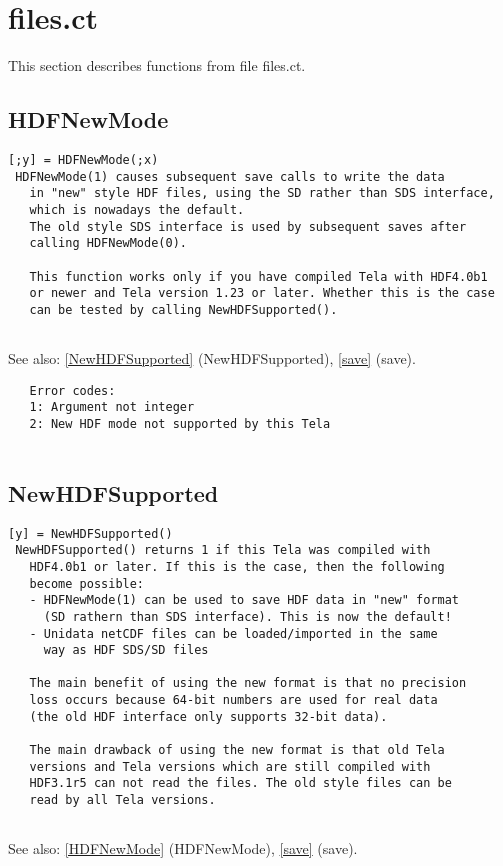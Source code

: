 \documentclass[a4paper]{article}
\begin{document}
\section{files.ct}

This section describes functions from file files.ct.




\subsection{HDFNewMode\label{HDFNewMode}}

\begin{tscreen}
\begin{verbatim}
[;y] = HDFNewMode(;x)
 HDFNewMode(1) causes subsequent save calls to write the data
   in "new" style HDF files, using the SD rather than SDS interface,
   which is nowadays the default.
   The old style SDS interface is used by subsequent saves after
   calling HDFNewMode(0).
   
   This function works only if you have compiled Tela with HDF4.0b1
   or newer and Tela version 1.23 or later. Whether this is the case
   can be tested by calling NewHDFSupported().
   
\end{verbatim}

See also: \ref{NewHDFSupported} {(NewHDFSupported)}, \ref{save} {(save)}.
\begin{verbatim}
   Error codes:
   1: Argument not integer
   2: New HDF mode not supported by this Tela
   
\end{verbatim}
\end{tscreen}



\subsection{NewHDFSupported\label{NewHDFSupported}}

\begin{tscreen}
\begin{verbatim}
[y] = NewHDFSupported()
 NewHDFSupported() returns 1 if this Tela was compiled with
   HDF4.0b1 or later. If this is the case, then the following
   become possible:
   - HDFNewMode(1) can be used to save HDF data in "new" format
     (SD rathern than SDS interface). This is now the default!
   - Unidata netCDF files can be loaded/imported in the same
     way as HDF SDS/SD files
   
   The main benefit of using the new format is that no precision
   loss occurs because 64-bit numbers are used for real data
   (the old HDF interface only supports 32-bit data).
   
   The main drawback of using the new format is that old Tela
   versions and Tela versions which are still compiled with
   HDF3.1r5 can not read the files. The old style files can be
   read by all Tela versions.
   
\end{verbatim}

See also: \ref{HDFNewMode} {(HDFNewMode)}, \ref{save} {(save)}.
\end{tscreen}
\end{document}
